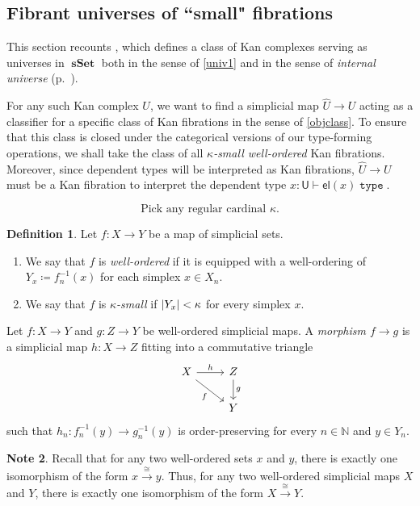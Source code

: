 \documentclass[10pt,letterpaper,cm]{nupset}
\theoremstyle{definition}
\newtheorem{definition}{Definition}[subsection]
\newtheorem{note}[definition]{Note}
\theoremstyle{theorem}
\theoremstyle{remark}
\newcommand{\U}{\mathsf{U}}
\newcommand{\el}{\mathsf{el}}
\newcommand{\0}{\mathbf{0}}
\newcommand{\1}{\mathbf{1}}
\newcommand{\2}{\mathbf{2}}
\DeclareMathOperator{\type}{\mathtt{type}}
\DeclareMathOperator{\sset}{\mathbf{sSet}}
\newcommand{\N}{\mathbb N}
\newcommand{\be}{\begin{enumerate}}
\newcommand{\ee}{\end{enumerate}}
\begin{document}
\subsection{Fibrant universes of ``small" fibrations}\label{fibuniv}

This section recounts  \cite[Sections 2.1 and 2.2]{KL}, which defines a class of Kan complexes serving as universes in $\sset$ both in the sense of \cref{univ1} and  in the sense of \textit{internal universe} (p.~\pageref{internaluniv}).

\medskip

For any such Kan complex $U$, we want to find a simplicial map $\widehat{U}\to U$ acting as a classifier for a specific class of Kan fibrations in the sense of \cref{objclass}. To ensure that this class is closed under the categorical versions of our type-forming operations, we shall take the class of all \textit{$\kappa$-small well-ordered} Kan fibrations. Moreover, since dependent types will be interpreted as Kan fibrations,  $\widehat{U}\to U$ must be a Kan fibration to interpret the dependent type ${x: \U \vdash \el(x) \type}$.

\smallskip

\[
\text{Pick any regular cardinal $\kappa$.} 
\]

\begin{definition} Let $f : X \to Y$ be a map of simplicial sets.
\be
\item We say that $f$ is \textit{well-ordered} if it is equipped with  a well-ordering of $Y_x \coloneqq f_n^{-1}(x)$ for each simplex $x\in X_n$.
\item We say that $f$ is \textit{$\kappa$-small} if $\mleft\lvert{Y_x}\mright\rvert < \kappa$ for every simplex $x$. 
\ee
\end{definition}


\smallskip

Let $f: X \to Y$ and $g : Z \to Y$ be well-ordered simplicial maps. A \textit{morphism $f \to g$} is a simplicial map $h : X \to Z$ fitting into a commutative triangle
\[
\begin{tikzcd}
X \arrow[r, "h"] \arrow[rd, "f"'] & Z \arrow[d, "g"] \\
                                  & Y                 
\end{tikzcd}
\]
such that $h_n : f_n^{-1}(y) \to g_n^{-1}(y)$ is order-preserving for every $n\in \N$ and $y\in Y_n$.

\begin{note}\label{uniquewoset}
Recall that for any two well-ordered sets $x$ and $y$, there is exactly one isomorphism of the form $x\overset{\cong}{\longrightarrow} y$. Thus, for any two well-ordered simplicial maps $X$ and $Y$, there is exactly one isomorphism of the form $X\overset{\cong}{\longrightarrow} Y$.
\end{note}
\end{document}
